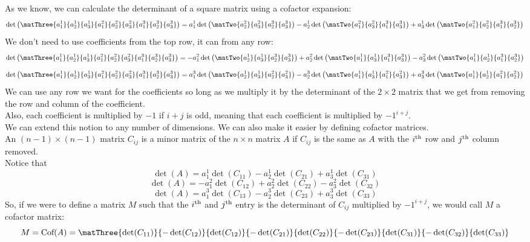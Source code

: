 \documentclass[12pt]{article}
\begin{document}
As we know, we can calculate the determinant
of a square matrix using a cofactor expansion:
\[ \det \para{ \matThree{a_1^1}{a_2^1}{a_3^1}
{a_1^2}{a_2^2}{a_3^2}{a_1^3}{a_2^3}{a_3^3} }
= a_1^1 \det\para{\matTwo{a_2^2}{a_3^2}
{a_2^3}{a_3^3}}
- a_2^1 \det\para{\matTwo{a_1^2}{a_3^2}
{a_1^3}{a_3^3}}
+ a_3^1 \det\para{\matTwo{a_1^2}{a_2^2}
{a_1^3}{a_2^3}} \]
We don't need to use coefficients from the top
row, it can from any row:
\[ \det \para{ \matThree{a_1^1}{a_2^1}{a_3^1}
{a_1^2}{a_2^2}{a_3^2}{a_1^3}{a_2^3}{a_3^3} }
= -a_1^2 \det\para{\matTwo{a_2^1}{a_3^1}
{a_2^3}{a_3^3}}
+ a_2^2 \det\para{\matTwo{a_1^1}{a_3^1}
{a_1^3}{a_3^3}}
- a_3^2 \det\para{\matTwo{a_1^1}{a_2^1}
{a_1^3}{a_2^3}} \]
\[ \det \para{ \matThree{a_1^1}{a_2^1}{a_3^1}
{a_1^2}{a_2^2}{a_3^2}{a_1^3}{a_2^3}{a_3^3} }
= a_1^3 \det\para{\matTwo{a_2^1}{a_3^1}
{a_2^2}{a_3^2}}
- a_2^3 \det\para{\matTwo{a_1^1}{a_3^1}
{a_1^2}{a_3^2}}
+ a_3^3 \det\para{\matTwo{a_1^1}{a_2^1}
{a_1^2}{a_2^2}} \]
We can use any row we want for the coefficients
so long as we multiply it by the determinant
of the $2 \times 2$ matrix that we get from
removing the row and column of the coefficient. \\
Also, each coefficient is multiplied
by $-1$ if $i+j$ is odd,
meaning that each coefficient is multiplied
by $-1^{i+j}$. \\

We can extend this notion to any number of dimensions.
We can also make it easier by defining
cofactor matrices. \\
An $(n-1)\times (n-1)$ matrix $C_{ij}$
is a minor matrix of the $n \times n$ matrix $A$
if $C_{ij}$ is the same as $A$ with 
the $i^{\text{th}}$ row and $j^{\text{th}}$ column removed. \\
Notice that
\[ \det(A) = a_1^1 \det(C_{11})
- a_2^1 \det(C_{21}) + a_3^1 \det(C_{31}) \]
\[ \det(A) = -a_1^2 \det(C_{12})
+ a_2^2 \det(C_{22}) - a_3^2 \det(C_{32}) \]
\[ \det(A) = a_1^3 \det(C_{13})
- a_2^3 \det(C_{23}) + a_3^3 \det(C_{33}) \]
So, if we were to define a matrix $M$
such that the $i^{\text{th}}$ and $j^{\text{th}}$
entry is the determinant of $C_{ij}$
multiplied by $-1^{i+j}$,
we would call $M$ a cofactor matrix:
\[ M = \cof(A) = 
\matThree{\det(C_{11})}{-\det(C_{12})}{\det(C_{12})}
{-\det(C_{21})}{\det(C_{22})}{-\det(C_{23})}
{\det(C_{31})}{-\det(C_{32})}{\det(C_{33})} \]
\end{document}
